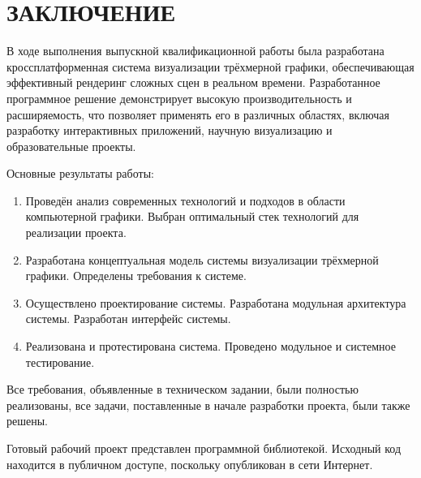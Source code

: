 \section*{ЗАКЛЮЧЕНИЕ}

В ходе выполнения выпускной квалификационной работы была разработана кроссплатформенная система визуализации трёхмерной графики, обеспечивающая эффективный рендеринг сложных сцен в реальном времени. Разработанное программное решение демонстрирует высокую производительность и расширяемость, что позволяет применять его в различных областях, включая разработку интерактивных приложений, научную визуализацию и образовательные проекты.

Основные результаты работы:

\begin{enumerate}
\item Проведён анализ современных технологий и подходов в области компьютерной графики. Выбран оптимальный стек технологий для реализации проекта.
\item Разработана концептуальная модель системы визуализации трёхмерной графики. Определены требования к системе.
\item Осуществлено проектирование системы. Разработана модульная архитектура системы. Разработан интерфейс системы.
\item Реализована и протестирована система. Проведено модульное и системное тестирование.
\end{enumerate}

Все требования, объявленные в техническом задании, были полностью реализованы, все задачи, поставленные в начале разработки проекта, были также решены.

Готовый рабочий проект представлен программной библиотекой. Исходный код находится в публичном доступе, поскольку опубликован в сети Интернет.
